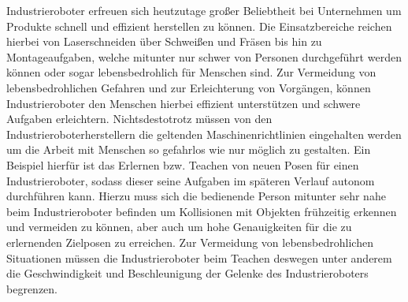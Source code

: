 Industrieroboter erfreuen sich heutzutage großer Beliebtheit bei Unternehmen um Produkte schnell und effizient herstellen zu können. Die Einsatzbereiche reichen hierbei von Laserschneiden über Schweißen und Fräsen bis hin zu Montageaufgaben, welche mitunter nur schwer von Personen durchgeführt werden können oder sogar lebensbedrohlich für Menschen sind. Zur Vermeidung von lebensbedrohlichen Gefahren und zur Erleichterung von Vorgängen, können Industrieroboter den Menschen hierbei effizient unterstützen und schwere Aufgaben erleichtern. Nichtsdestotrotz müssen von den Industrieroboterherstellern die geltenden Maschinenrichtlinien eingehalten werden um die Arbeit mit Menschen so gefahrlos wie nur möglich zu gestalten. Ein Beispiel hierfür ist das Erlernen bzw. Teachen von neuen Posen für einen Industrieroboter, sodass dieser seine Aufgaben im späteren Verlauf autonom durchführen kann. Hierzu muss sich die bedienende Person mitunter sehr nahe beim Industrieroboter befinden um Kollisionen mit Objekten frühzeitig erkennen und vermeiden zu können, aber auch um hohe Genauigkeiten für die zu erlernenden Zielposen zu erreichen. Zur Vermeidung von lebensbedrohlichen Situationen müssen die Industrieroboter beim Teachen deswegen unter anderem die Geschwindigkeit und Beschleunigung der Gelenke des Industrieroboters begrenzen.

